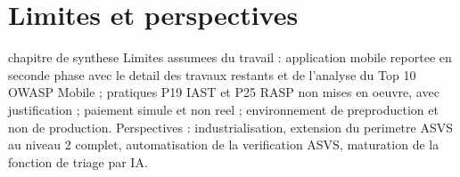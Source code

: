 ﻿%
\chapter{Limites et perspectives}
\label{chap:limites}

\begin{constat}{chapitre de synthese}
Limites assumees du travail : application mobile reportee en seconde phase avec le detail des travaux restants et de l'analyse du Top 10 OWASP Mobile ; pratiques P19 IAST et P25 RASP non mises en oeuvre, avec justification ; paiement simule et non reel ; environnement de preproduction et non de production. Perspectives : industrialisation, extension du perimetre ASVS au niveau 2 complet, automatisation de la verification ASVS, maturation de la fonction de triage par IA.
\end{constat}
